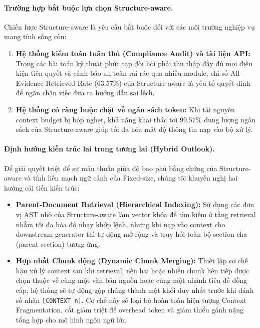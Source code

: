 \paragraph{Trường hợp bắt buộc lựa chọn Structure-aware.}
Chiến lược Structure-aware là yêu cầu bắt buộc đối với các môi trường nghiệp vụ mang tính sống còn:
\begin{enumerate}
    \item \textbf{Hệ thống kiểm toán tuân thủ (Compliance Audit) và tài liệu API:} Trong các bài toán kỹ thuật phức tạp đòi hỏi phải thu thập đầy đủ mọi điều kiện tiên quyết và cảnh báo an toàn rải rác qua nhiều module, chỉ số All-Evidence-Retrieved Rate ($63.57\%$) của Structure-aware là yếu tố quyết định để ngăn chặn việc đưa ra hướng dẫn sai lệch.
    \item \textbf{Hệ thống có ràng buộc chặt về ngân sách token:} Khi tài nguyên context budget bị bóp nghẹt, khả năng khai thác tới $99.57\%$ dung lượng ngân sách của Structure-aware giúp tối đa hóa mật độ thông tin nạp vào bộ xử lý.
\end{enumerate}

\paragraph{Định hướng kiến trúc lai trong tương lai (Hybrid Outlook).}
Để giải quyết triệt để sự mâu thuẫn giữa độ bao phủ bằng chứng của Structure-aware và tính liền mạch ngữ cảnh của Fixed-size, chúng tôi khuyến nghị hai hướng cải tiến kiến trúc:
\begin{itemize}
    \item \textbf{Parent-Document Retrieval (Hierarchical Indexing):} Sử dụng các đơn vị AST nhỏ của Structure-aware làm vector khóa để tìm kiếm ở tầng retrieval nhằm tối đa hóa độ nhạy khớp lệnh, nhưng khi nạp vào context cho downstream generator thì tự động mở rộng và truy hồi toàn bộ section cha (parent section) tương ứng.
    \item \textbf{Hợp nhất Chunk động (Dynamic Chunk Merging):} Thiết lập cơ chế hậu xử lý context sau khi retrieval: nếu hai hoặc nhiều chunk liên tiếp được chọn thuộc về cùng một văn bản nguồn hoặc cùng một nhánh tiêu đề đồng cấp, hệ thống sẽ tự động gộp chúng thành một khối duy nhất trước khi đánh số nhãn \texttt{[CONTEXT n]}. Cơ chế này sẽ loại bỏ hoàn toàn hiện tượng Context Fragmentation, cắt giảm triệt để overhead token và giảm thiểu gánh nặng tổng hợp cho mô hình ngôn ngữ lớn.
\end{itemize}
